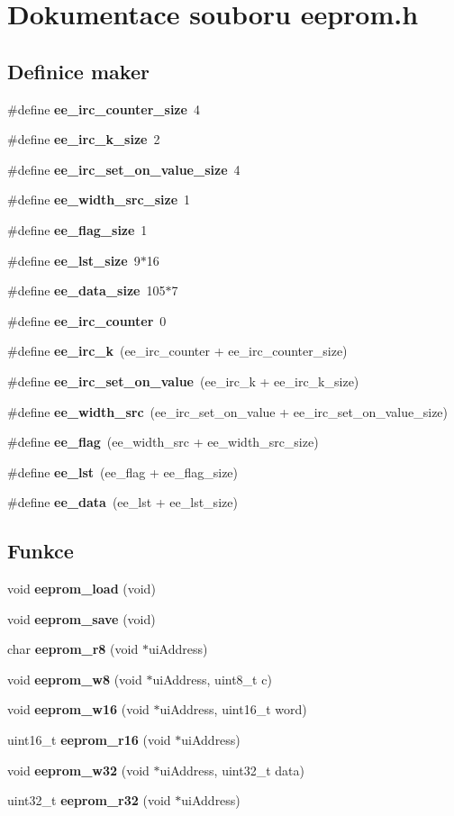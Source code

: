 \section{Dokumentace souboru eeprom.h}
\label{eeprom_8h}
\subsection*{Definice maker}
\begin{DoxyCompactItemize}
\item 
\#define {\bf ee\_\-irc\_\-counter\_\-size}~4
\item 
\#define {\bf ee\_\-irc\_\-k\_\-size}~2
\item 
\#define {\bf ee\_\-irc\_\-set\_\-on\_\-value\_\-size}~4
\item 
\#define {\bf ee\_\-width\_\-src\_\-size}~1
\item 
\#define {\bf ee\_\-flag\_\-size}~1
\item 
\#define {\bf ee\_\-lst\_\-size}~9$\ast$16
\item 
\#define {\bf ee\_\-data\_\-size}~105$\ast$7
\item 
\#define {\bf ee\_\-irc\_\-counter}~0
\item 
\#define {\bf ee\_\-irc\_\-k}~(ee\_\-irc\_\-counter + ee\_\-irc\_\-counter\_\-size)
\item 
\#define {\bf ee\_\-irc\_\-set\_\-on\_\-value}~(ee\_\-irc\_\-k + ee\_\-irc\_\-k\_\-size)
\item 
\#define {\bf ee\_\-width\_\-src}~(ee\_\-irc\_\-set\_\-on\_\-value + ee\_\-irc\_\-set\_\-on\_\-value\_\-size)
\item 
\#define {\bf ee\_\-flag}~(ee\_\-width\_\-src + ee\_\-width\_\-src\_\-size)
\item 
\#define {\bf ee\_\-lst}~(ee\_\-flag + ee\_\-flag\_\-size)
\item 
\#define {\bf ee\_\-data}~(ee\_\-lst + ee\_\-lst\_\-size)
\end{DoxyCompactItemize}
\subsection*{Funkce}
\begin{DoxyCompactItemize}
\item 
void {\bf eeprom\_\-load} (void)
\item 
void {\bf eeprom\_\-save} (void)
\item 
char {\bf eeprom\_\-r8} (void $\ast$uiAddress)
\item 
void {\bf eeprom\_\-w8} (void $\ast$uiAddress, uint8\_\-t c)
\item 
void {\bf eeprom\_\-w16} (void $\ast$uiAddress, uint16\_\-t word)
\item 
uint16\_\-t {\bf eeprom\_\-r16} (void $\ast$uiAddress)
\item 
void {\bf eeprom\_\-w32} (void $\ast$uiAddress, uint32\_\-t data)
\item 
uint32\_\-t {\bf eeprom\_\-r32} (void $\ast$uiAddress)
\end{DoxyCompactItemize}

